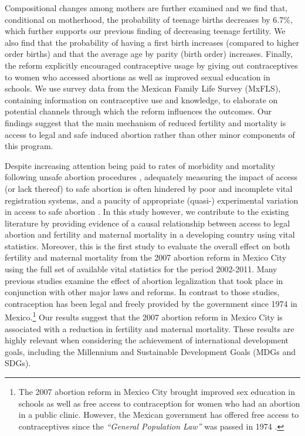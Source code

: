 \documentclass[a4paper, 11pt]{article}
\begin{document}
\begin{spacing}{2}
Compositional changes among mothers are further examined and we find that, conditional on motherhood, the probability of teenage births decreases by 6.7\%, which further supports our previous finding of decreasing teenage fertility. We also find that the probability of having a first birth increases (compared to higher order births) and that the average age by parity (birth order) increases. Finally, the reform explicitly encouraged contraceptive usage by giving out contraceptives to women who accessed abortions as well as improved sexual education in schools. We use survey data from the Mexican Family Life Survey (MxFLS), containing information on contraceptive use and knowledge, to elaborate on potential channels through which the reform influences the outcomes. Our findings suggest that the main mechanism of reduced fertility and mortality is access to legal and safe induced abortion rather than other minor components of this program.   

Despite increasing attention being paid to rates of morbidity and mortality following unsafe abortion procedures \citep{Grimes2006,Brown2007,Kulczycki2011}, adequately measuring the impact of access (or lack thereof) to safe abortion is often hindered by poor and incomplete vital registration systems, and a paucity of appropriate (quasi-) experimental variation in access to safe abortion \citep{Grimes2006}. In this study however, we contribute to the existing literature by providing evidence of a causal relationship between access to legal abortion and fertility and maternal mortality in a developing country using vital statistics. Moreover, this is the first study to evaluate the overall effect on both fertility and maternal mortality from the 2007 abortion reform in Mexico City using the full set of available vital statistics for the period 2002-2011. Many previous studies examine the effect of abortion legalization that took place in conjunction with other major laws and reforms. In contrast to those studies, contraception has been legal and freely provided by the government since 1974 in Mexico.\footnote{The 2007 abortion reform in Mexico City brought improved sex education in schools as well as free access to contraception for women who had an abortion in a public clinic. However, the Mexican government has offered free access to contraceptives since the \textit{``General Population Law''} was passed in 1974 \citep{GIRE2009}.} Our results suggest that the 2007 abortion reform in Mexico City is associated with a reduction in fertility and maternal mortality. These results are highly relevant when considering the achievement of international development goals, including the Millennium and Sustainable Development Goals (MDGs and SDGs).



\end{spacing}
\end{document}
